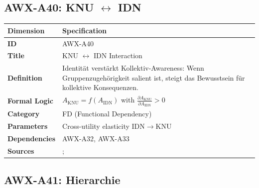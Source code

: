 
\subsection{AWX-A40: KNU $\leftrightarrow$ IDN}

\begin{table}[htbp]
\small
\begin{tabular}{p{3cm}p{11cm}}
\toprule
\textbf{Dimension} & \textbf{Specification} \\
\midrule
\textbf{ID} & AWX-A40 \\
\textbf{Title} & KNU $\leftrightarrow$ IDN Interaction \\
\textbf{Definition} & Identität verstärkt Kollektiv-Awareness: Wenn Gruppenzugehörigkeit salient ist, steigt das Bewusstsein für kollektive Konsequenzen. \\
\textbf{Formal Logic} & $A_{\text{KNU}} = f(A_{\text{IDN}})$ with $\frac{\partial A_{\text{KNU}}}{\partial A_{\text{IDN}}} > 0$ \\
\textbf{Category} & FD (Functional Dependency) \\
\textbf{Parameters} & Cross-utility elasticity IDN$\rightarrow$KNU \\
\textbf{Dependencies} & AWX-A32, AWX-A33 \\
\textbf{Sources} & \citet{akerlof2000identity}; \citet{tajfel1979integrative} \\
\bottomrule
\end{tabular}
\end{table}


\subsection{AWX-A41: Hierarchie}

